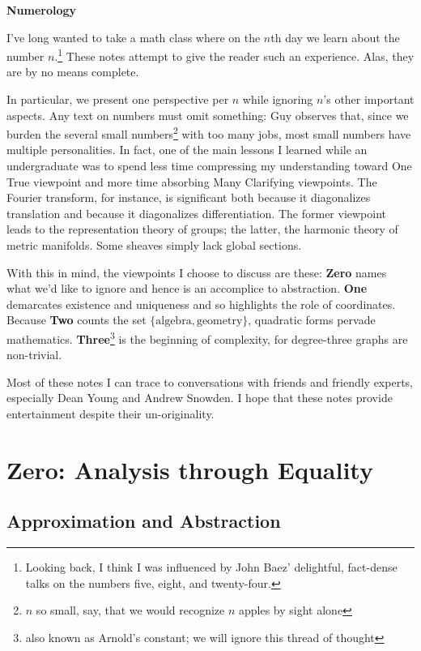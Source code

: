 \documentclass[11pt, justified]{tufte-book}
\theoremstyle{definition}
\newcommand{\mtit}[1]{%
    {%
        \noindent
        \Huge\color{mblu}\bf\textsf{#1}
        \vspace{0.3cm}
    }
}
\newcommand{\msec}[1]{
    \chapter{\color{mblu}\textsf{#1}}
}
\newcommand{\mssec}[1]{\section{\color{mblu}\textsf{#1}}}
\begin{document}
\renewcommand{\cleardoublepage}{}

    \mtit{Numerology}

        I've long wanted to take a math class where on the $n$th day we learn
        about the number $n$.\footnote{
            Looking back, I think I was influenced by John Baez' delightful,
            fact-dense talks on the numbers five, eight, and twenty-four. 
        } These notes attempt to give the reader such an
        experience.  Alas, they are by no means complete.

        In particular, we present one perspective per $n$ while ignoring $n$'s
        other important aspects.  Any text on numbers must omit something:
        Guy observes that, since we burden the several small numbers\footnote{
            $n$ so small, say, that we would recognize $n$ apples by sight alone 
        } with too many jobs,
        most small numbers have multiple personalities.  In fact, one of the
        main lessons I learned while an undergraduate was to spend less time
        compressing my understanding toward One True viewpoint and more time
        absorbing Many Clarifying viewpoints.  
            The Fourier transform, for instance, is significant both because it
            diagonalizes translation and because it diagonalizes
            differentiation.  The former viewpoint leads to the representation
            theory of groups; the latter, the harmonic theory of metric
            manifolds.
        Some sheaves simply lack global sections.

        With this in mind, the viewpoints I choose to discuss are these:
        \textbf{Zero} names what we'd like to ignore and hence is an accomplice
        to abstraction.  \textbf{One} demarcates existence and uniqueness and
        so highlights the role of coordinates.  Because \textbf{Two} counts the
        set $\{\text{algebra}, \text{geometry}\}$, quadratic forms pervade
        mathematics.  \textbf{Three}\footnote{also known as Arnold's constant;
        we will ignore this thread of thought}
        is the beginning of complexity, for degree-three graphs are
        non-trivial. 

            Most of these notes I can trace to conversations with friends and
            friendly experts,  especially Dean Young and Andrew Snowden.  I
            hope that these notes provide entertainment despite their
            un-originality.


    \msec{Zero: Analysis through Equality}
        \mssec{Approximation and Abstraction}
\end{document}
